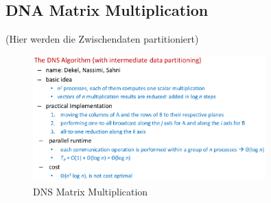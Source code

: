 \hypertarget{dna-matrix-multiplication}{%
\subsection{DNA Matrix Multiplication}\label{dna-matrix-multiplication}}

(Hier werden die Zwischendaten partitioniert)

\begin{figure}[H]
\centering
\includegraphics[width=0.8\textwidth]{figures/dnsMatrixMultiplication1.png}
\caption{DNS Matrix Multiplication}
\end{figure}

\clearpage